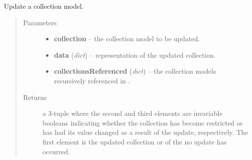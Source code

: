 \documentclass[letterpaper,10pt,english]{sphinxmanual}
\begin{document}

\begin{fulllineitems}
\label{api:onlinelinguisticdatabase.controllers.oldcollections.updateCollection}
Update a collection model.
\begin{quote}\begin{description}
\item[{Parameters}] \leavevmode\begin{itemize}
\item {} 
\textbf{collection} -- the collection model to be updated.

\item {} 
\textbf{data} (\emph{dict}) -- representation of the updated collection.

\item {} 
\textbf{collectionsReferenced} (\emph{dict}) -- the collection models recursively referenced in .

\end{itemize}

\item[{Returns}] \leavevmode
a 3-tuple where the second and third elements are invariable
booleans indicating whether the collection has become restricted or has
had its  value changed as a result of the update,
respectively.  The first element is the updated collection or 
of the no update has occurred.

\end{description}\end{quote}

\end{fulllineitems}

\end{document}
